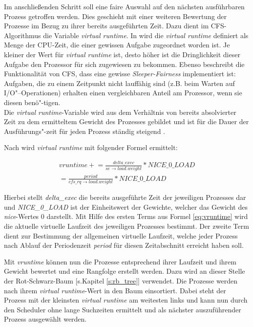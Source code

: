 Im anschließenden Schritt soll eine faire Auswahl auf den nächsten ausführbaren Prozess getroffen werden. Dies geschieht mit einer weiteren Bewertung der Prozesse im Bezug zu ihrer bereits ausgeführten Zeit. 
Dazu dient im CFS-Algorithmus die Variable \textit{virtual runtime}. In \cite{mjones} wird die \textit{virtual runtime} definiert als Menge der CPU-Zeit, die einer gewissen Aufgabe zugeordnet worden ist. Je kleiner der Wert für \textit{virtual runtime} ist, desto höher ist die Dringlichkeit dieser Aufgabe den Prozessor für sich zugewiesen zu bekommen. Ebenso beschreibt \cite{mjones} die Funktionalität von CFS, dass eine gewisse \textit{Sleeper-Fairness} implementiert ist: Aufgaben, die zu einem Zeitpunkt nicht lauffähig sind (z.B. beim Warten auf I/O"--Operationen) erhalten ei\-nen vergleichbaren Anteil am Prozessor, wenn sie diesen benö"-tigen.\\
Die \textit{virtual runtime}-Variable wird aus dem Verhältnis von bereits absolvierter Zeit zu dem ermitteltem Gewicht des Prozesses gebildet und ist für die Dauer der Ausführungs"-zeit für jeden Prozess ständig steigend \cite{rlove}. 

Nach \cite{paperfairness} wird \textit{virtual runtime} mit folgender Formel ermittelt:

\begin{multline}
vruntime \mathrel{+}= \frac{delta\_exec}{se\rightarrow load.weight} * NICE\_0\_LOAD \\ = \frac{period}{cfs\_rq\rightarrow load.weight} * NICE\_0\_LOAD
\label{eq:vruntime}
\end{multline}

Hierbei stellt \textit{delta\_exec} die bereits ausgeführte Zeit der jeweiligen Prozesses dar und \textit{NICE\_0\_LOAD} ist der Einheitswert der Gewichte, welcher das Gewicht des \textit{nice}-Wertes 0 darstellt.  
Mit Hilfe des ersten Terms aus Formel \ref{eq:vruntime} wird die aktuelle virtuelle Laufzeit des jeweiligen Prozesses bestimmt. Der zweite Term dient zur Bestimmung der allgemeinen virtuelle Laufzeit, welche jeder Prozess nach Ablauf der Periodenzeit \textit{period} für diesen Zeitabschnitt erreicht haben soll. 

Mit \textit{vruntime} können nun die Prozesse entsprechend ihrer Laufzeit und ihrem Gewicht bewertet und eine Rangfolge erstellt werden. Dazu wird an dieser Stelle der Rot-Schwarz-Baum [s.Kapitel \ref{s:rb_tree}] verwendet. Die Prozesse werden nach ihrem \textit{virtual runtime}-Wert in den Baum einsortiert. Dabei steht der Prozess mit der kleinsten \textit{virtual runtime} am weitesten links und kann nun durch den Scheduler ohne lange Suchzeiten ermittelt und als nächster auszuführender Prozess ausgewählt werden. 

